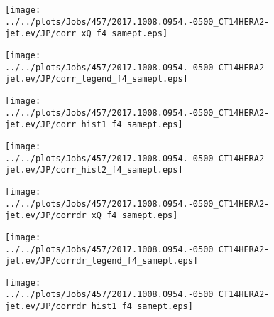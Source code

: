 \documentclass[12pt]{article}
\begin{document}
\begin{figure}
\texttt{[image: ../../plots/Jobs/457/2017.1008.0954.-0500\_CT14HERA2-jet.ev/JP/corr\_xQ\_f4\_samept.eps]}
\caption{}
\end{figure}\newpage\clearpage
\begin{figure}
\texttt{[image: ../../plots/Jobs/457/2017.1008.0954.-0500\_CT14HERA2-jet.ev/JP/corr\_legend\_f4\_samept.eps]}
\caption{}
\end{figure}\newpage\clearpage
\begin{figure}
\texttt{[image: ../../plots/Jobs/457/2017.1008.0954.-0500\_CT14HERA2-jet.ev/JP/corr\_hist1\_f4\_samept.eps]}
\caption{}
\end{figure}\newpage\clearpage
\begin{figure}
\texttt{[image: ../../plots/Jobs/457/2017.1008.0954.-0500\_CT14HERA2-jet.ev/JP/corr\_hist2\_f4\_samept.eps]}
\caption{}
\end{figure}\newpage\clearpage
\begin{figure}
\texttt{[image: ../../plots/Jobs/457/2017.1008.0954.-0500\_CT14HERA2-jet.ev/JP/corrdr\_xQ\_f4\_samept.eps]}
\caption{}
\end{figure}\newpage\clearpage
\begin{figure}
\texttt{[image: ../../plots/Jobs/457/2017.1008.0954.-0500\_CT14HERA2-jet.ev/JP/corrdr\_legend\_f4\_samept.eps]}
\caption{}
\end{figure}\newpage\clearpage
\begin{figure}
\texttt{[image: ../../plots/Jobs/457/2017.1008.0954.-0500\_CT14HERA2-jet.ev/JP/corrdr\_hist1\_f4\_samept.eps]}
\caption{}
\end{figure}\newpage\clearpage
\end{document}
